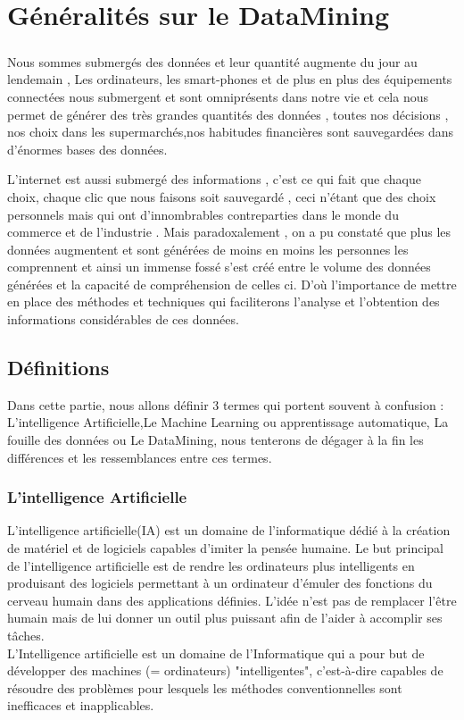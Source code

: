 \chapter{Généralités sur le DataMining }
\paragraph{}
Nous sommes submergés des données et leur quantité augmente du jour au lendemain , Les ordinateurs, les smart-phones et de plus en plus des équipements connectées nous submergent et sont omniprésents dans notre vie et cela nous permet de générer des très grandes quantités des données , toutes nos décisions , nos choix dans les supermarchés,nos habitudes financières sont sauvegardées dans d'énormes bases des données.

L'internet est aussi submergé des informations , c'est ce qui fait que chaque choix, chaque clic que nous faisons soit sauvegardé , ceci n'étant  que des choix personnels mais qui ont d'innombrables contreparties dans le monde du commerce et de l'industrie .
Mais paradoxalement , on a pu constaté  que plus les données augmentent et sont générées de moins en moins les personnes les comprennent   et ainsi un immense fossé s'est créé entre le volume des données générées et la capacité de compréhension de celles ci.
D'où l'importance de mettre en place des méthodes et techniques qui faciliterons l'analyse et l'obtention des informations considérables de ces données.
\section{Définitions}
Dans cette partie,  nous allons définir 3 termes qui portent souvent à confusion : L'intelligence Artificielle,Le Machine Learning ou apprentissage automatique, La fouille des données ou Le DataMining, nous tenterons de dégager à la fin les différences et les ressemblances entre ces  termes.
\subsection{L'intelligence Artificielle}
L’intelligence artificielle(IA) est un domaine de l’informatique dédié à la création de matériel et de logiciels capables d’imiter la pensée humaine. Le but principal de l’intelligence artificielle est de rendre les ordinateurs plus intelligents en produisant des logiciels permettant à un ordinateur d’émuler des fonctions du cerveau humain dans des applications définies. L’idée n’est pas de remplacer l’être humain mais de lui donner un outil plus puissant afin de l’aider à accomplir ses tâches.\cite{coursKasoro}\\
L'Intelligence artificielle est un domaine de l'Informatique qui a pour but de développer des machines 
(= ordinateurs) "intelligentes", c'est-à-dire capables de résoudre des problèmes pour lesquels les méthodes conventionnelles sont inefficaces et inapplicables. 
\cite{coursKasoro}
